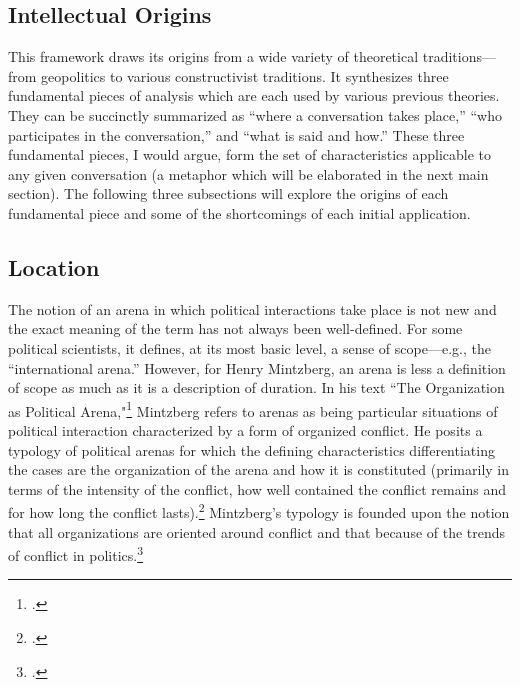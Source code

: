 \documentclass[openany,twoside]{memoir}
\begin{document}
\begin{Spacing}{2}
\section{Intellectual Origins}
This framework draws its origins from a wide variety of theoretical traditions---from geopolitics to various constructivist traditions.
It synthesizes three fundamental pieces of analysis which are each used by various previous theories.
They can be succinctly summarized as ``where a conversation takes place,'' ``who participates in the conversation,'' and ``what is said and how.''
These three fundamental pieces, I would argue, form the set of characteristics applicable to any given conversation (a metaphor which will be elaborated in the next main section).
The following three subsections will explore the origins of each fundamental piece and some of the shortcomings of each initial application.

\subsection{Location}
The notion of an arena in which political interactions take place is not new and the exact meaning of the term has not always been well-defined. 
For some political scientists, it defines, at its most basic level, a sense of scope---e.g., the ``international arena.'' 
However, for Henry Mintzberg, an arena is less a definition of scope as much as it is a description of duration. 
In his text ``The Organization as Political Arena,"\footcite{mintzberg85} Mintzberg refers to arenas as being particular situations of political interaction characterized by a form of organized conflict. 
He posits a typology of political arenas for which the defining characteristics differentiating the cases are the organization of the arena and how it is constituted (primarily in terms of the intensity of the conflict, how well contained the conflict remains and for how long the conflict lasts).\footcite[141]{mintzberg85} 
Mintzberg's typology is founded upon the notion that all organizations are oriented around conflict and that because of the trends of conflict in politics.\footcite{mintzberg85}


\end{Spacing}
\end{document}

